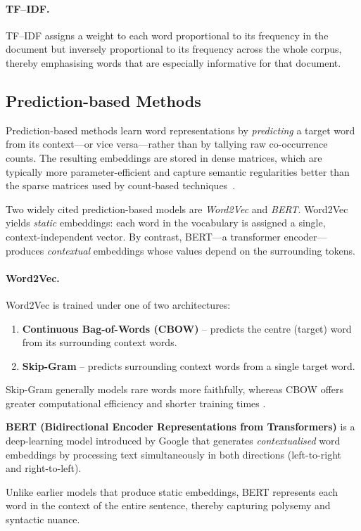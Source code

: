 \documentclass{SGGW-thesis-EN}
\begin{document}
\paragraph{TF–IDF.}
TF–IDF assigns a weight to each word proportional to its frequency in the document but inversely
proportional to its frequency across the whole corpus, thereby emphasising words that are
especially informative for that document.
\subsection{Prediction-based Methods}
Prediction-based methods learn word representations by \emph{predicting} a target word from its
context—or vice versa—rather than by tallying raw co-occurrence counts.
The resulting embeddings are stored in dense matrices, which are typically more
parameter-efficient and capture semantic regularities better than the sparse matrices used by
count-based techniques~\cite{jurafsky2023slp3}.

Two widely cited prediction-based models are \textit{Word2Vec} and \textit{BERT}.
Word2Vec yields \emph{static} embeddings: each word in the vocabulary is assigned a single,
context-independent vector.
By contrast, BERT—a transformer encoder—produces \emph{contextual} embeddings whose values depend
on the surrounding tokens.

\paragraph{Word2Vec.}
Word2Vec is trained under one of two architectures:%
\begin{enumerate}
  \item \textbf{Continuous Bag-of-Words (CBOW)} – predicts the centre (target) word from its surrounding
        context words.
  \item \textbf{Skip-Gram} – predicts surrounding context words from a single target word.
\end{enumerate}
Skip-Gram generally models rare words more faithfully, whereas CBOW offers greater computational
efficiency and shorter training times \cite{mikolov2013distributed}.

\textbf{BERT (Bidirectional Encoder Representations from Transformers)} is a deep-learning model introduced by Google that generates 
\emph{contextualised} word embeddings by processing text simultaneously in both directions (left-to-right and right-to-left).

Unlike earlier models that produce static embeddings, BERT represents each word in the context of the entire sentence, thereby capturing 
polysemy and syntactic nuance.
\end{document}

